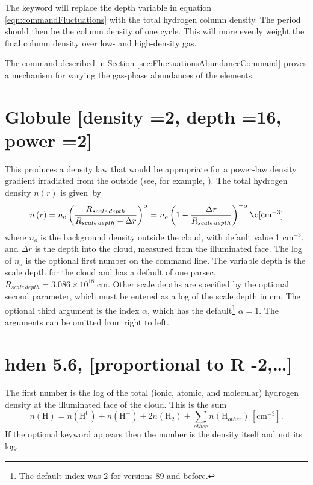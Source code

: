 The keyword  will replace
the depth variable in equation \ref{eqn:commandFluctuations} with
the total hydrogen column density.
The period should then be the column
density of one cycle.
This will more evenly weight the final column density
over low- and high-density gas.

The  command
described in Section \ref{sec:FluctuationsAbundanceCommand}  proves a mechanism
for varying the gas-phase abundances of the elements.

\section{Globule [density =2, depth =16, power =2]}

This produces a density law that would be appropriate for a power-law
density gradient irradiated from the outside (see, for example, \citealp{Williams1992}).  The total hydrogen density $n(r)$ is given~by
\begin{equation}
n\left( r \right) = n_{\mathrm{o}} \left( {\frac{{R_{scale\,depth}
}}{{R_{scale\,depth}  - \Delta r}}} \right)^\alpha   = n_o \left( {1 -
\frac{{\Delta r}}{{R_{scale\,depth} }}} \right)^{ - \alpha }
\c[\mathrm{cm}^{-3}]%
\end{equation}
where $n_o$ is the background density outside the cloud,
with default value
1 cm$^{-3}$, and $\Delta r$ is the depth into the cloud,
measured from the illuminated face.
The log of $n_o$ is the optional first number on the command line.
The variable  depth is the scale depth
for the cloud and has a default
of one parsec, $R_{scale\, depth} = 3.086\times 10^{18} \; \mathrm{cm}$.
Other scale depths are specified
by the optional second parameter, which must be entered as a log of the
scale depth in cm.
The optional third argument is the index $\alpha$, which has
the default\footnote{The default index was 2 for versions 89 and before.} $\alpha = 1$. The arguments can be omitted from right to left.

\section{hden 5.6, [proportional to R -2,\dots]}

The first number is the log of the total (ionic, atomic, and molecular)
hydrogen density at the illuminated face of the cloud.
This is the sum
\begin{equation}
n\left( {\mathrm{H}} \right) = n\left( {{\mathrm{H}}^{\mathrm{0}} } \right) + n\left(
{{\mathrm{H}}^ +  } \right) + 2n\left( {{\mathrm{H}}_2 } \right) +
\sum\limits_{other} {n\left( {{\mathrm{H}}_{other}^{} } \right)}
\, [\mathrm{cm}^{-3}] .%
\end{equation}
If the optional keyword  appears then
the number is the density itself and not its log.

